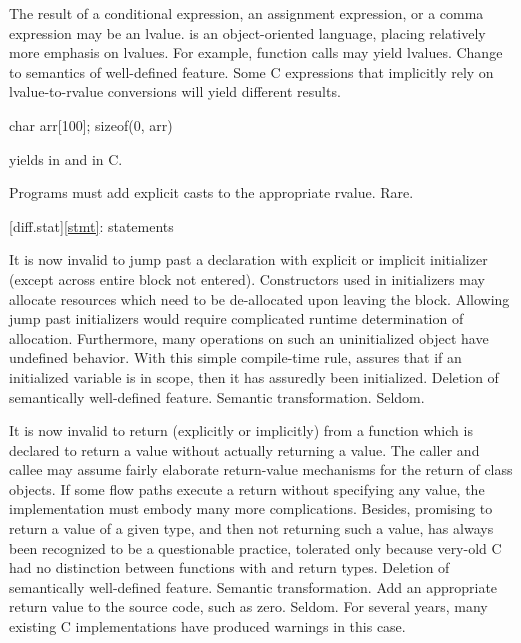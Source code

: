 %
%
%
\change
The result of a conditional expression, an assignment expression, or a comma expression may be an lvalue.
\rationale
\Cpp{} is an object-oriented language, placing relatively
more emphasis on lvalues.  For example, function calls may
yield lvalues.
\effect
Change to semantics of well-defined feature.  Some C
expressions that implicitly rely on lvalue-to-rvalue
conversions will yield different results.
\begin{example}
\begin{codeblock}
char arr[100];
sizeof(0, arr)
\end{codeblock}
yields
in \Cpp{} and
in C.
\end{example}
\difficulty
Programs must add explicit casts to the appropriate rvalue.
\howwide
Rare.

[diff.stat]{\ref{stmt}: statements}

\change
It is now invalid to jump past a declaration with explicit or implicit initializer (except across entire block not entered).
\rationale
Constructors used in initializers may allocate
resources which need to be de-allocated upon leaving the
block.
Allowing jump past initializers would require
complicated runtime determination of allocation.
Furthermore, many operations on such an uninitialized object
have undefined behavior.
With this simple compile-time rule, \Cpp{} assures that
if an initialized variable is in scope, then it has assuredly been
initialized.
\effect
Deletion of semantically well-defined feature.
\difficulty
Semantic transformation.
\howwide
Seldom.

\change
It is now invalid to return (explicitly or implicitly) from a function which is
declared to return a value without actually returning a value.
\rationale
The caller and callee may assume fairly elaborate
return-value mechanisms for the return of class objects.
If
some flow paths execute a return without specifying any value,
the implementation must embody many more complications.
Besides,
promising to return a value of a given type, and then not returning
such a value, has always been recognized to be a questionable
practice, tolerated only because very-old C had no distinction between
functions with  and  return types.
\effect
Deletion of semantically well-defined feature.
\difficulty
Semantic transformation.
Add an appropriate return value to the source code, such as zero.
\howwide
Seldom.
For several years, many existing C implementations have produced warnings in
this case.

